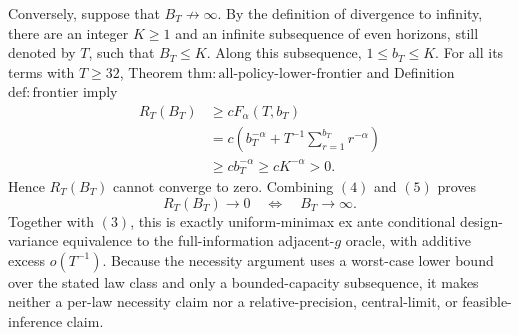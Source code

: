 Conversely, suppose that \(B_T\not\to\infty\).  By the definition of divergence to infinity, there are an integer \(K\ge1\) and an infinite subsequence of even horizons, still denoted by \(T\), such that \(B_T\le K\).  Along this subsequence, \(1\le b_T\le K\).  For all its terms with \(T\ge32\), Theorem \(\mathrm{thm:all\text{-}policy\text{-}lower\text{-}frontier}\) and Definition \(\mathrm{def:frontier}\) imply
\[
\begin{split}
R_T(B_T)
&\ge cF_\alpha(T,b_T)\\
&=c\left(b_T^{-\alpha}+T^{-1}\sum_{r=1}^{b_T}r^{-\alpha}\right)\\
&\ge cb_T^{-\alpha}
\ge cK^{-\alpha}>0.
\end{split}
\tag{5}
\]
Hence \(R_T(B_T)\) cannot converge to zero.  Combining \((4)\) and \((5)\) proves
\[
R_T(B_T)\to0
\quad\Longleftrightarrow\quad
B_T\to\infty.
\]
Together with \((3)\), this is exactly uniform-minimax ex ante conditional design-variance equivalence to the full-information adjacent-\(g\) oracle, with additive excess \(o(T^{-1})\).  Because the necessity argument uses a worst-case lower bound over the stated law class and only a bounded-capacity subsequence, it makes neither a per-law necessity claim nor a relative-precision, central-limit, or feasible-inference claim.
